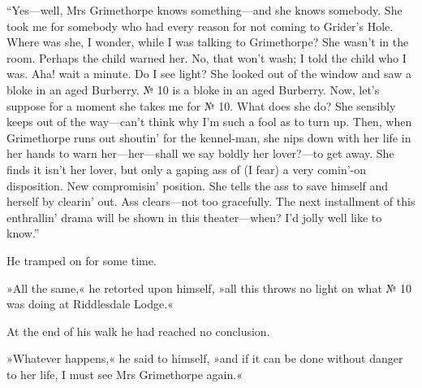 \enquote{Yes\allowbreak---\allowbreak well, Mrs Grimethorpe knows something\allowbreak---\allowbreak and she knows somebody.  She took me for somebody who had every reason for not coming to Grider's Hole. Where was she, I wonder, while I was talking to Grimethorpe? She wasn't in the room. Perhaps the child warned her. No, that won't wash; I told the child who I was. Aha! wait a minute. Do I see light? She looked out of the window and saw a bloke in an aged Burberry. № 10 is a bloke in an aged Burberry. Now, let's suppose for a moment she takes me for № 10. What does she do? She sensibly keeps out of the way\allowbreak---\allowbreak can't think why I'm such a fool as to turn up.  Then, when Grimethorpe runs out shoutin' for the kennel-man, she nips down with her life in her hands to warn her\allowbreak---\allowbreak her---shall we say boldly her lover?---to get away. She finds it isn't her lover, but only a gaping ass of (I fear) a very comin'-on disposition. New compromisin' position. She tells the ass to save himself and herself by clearin' out. Ass clears\allowbreak---\allowbreak not too gracefully. The next installment of this enthrallin' drama will be shown in this theater\allowbreak---\allowbreak when? I'd jolly well like to know.}

He tramped on for some time.

»All the same,« he retorted upon himself, »all this throws no light on what № 10 was doing at Riddlesdale Lodge.«

At the end of his walk he had reached no conclusion.

»Whatever happens,« he said to himself, »and if it can be done without danger to her life, I must see Mrs Grimethorpe again.«



